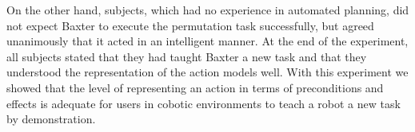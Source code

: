 On the other hand, subjects, which had no experience in automated planning, did not expect Baxter to execute the permutation task successfully, but agreed unanimously that it acted in an intelligent manner. At the end of the experiment, all subjects stated that they had taught Baxter a new task and that they understood the representation of the action models well. With this experiment we showed that the level of representing an action in terms of preconditions and effects is adequate for users in cobotic environments to teach a robot a new task by demonstration. 


%
%
%



